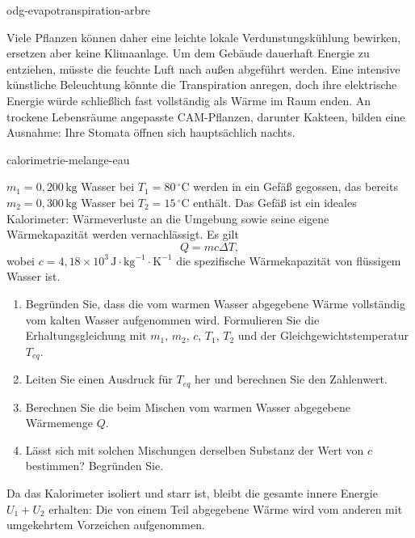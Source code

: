 \begin{exo}{odg-evapotranspiration-arbre}
\begin{solution}
Viele Pflanzen können daher eine leichte lokale Verdunstungskühlung bewirken, ersetzen aber keine Klimaanlage. Um dem Gebäude dauerhaft Energie zu entziehen, müsste die feuchte Luft nach außen abgeführt werden. Eine intensive künstliche Beleuchtung könnte die Transpiration anregen, doch ihre elektrische Energie würde schließlich fast vollständig als Wärme im Raum enden. An trockene Lebensräume angepasste CAM-Pflanzen, darunter Kakteen, bilden eine Ausnahme: Ihre Stomata öffnen sich hauptsächlich nachts.
\end{solution}
\end{exo}

\begin{exo}{calorimetrie-melange-eau}

$m_1=0{,}200\,\text{kg}$ Wasser bei $T_1=80\,^\circ\text{C}$ werden in ein Gefäß gegossen, das bereits $m_2=0{,}300\,\text{kg}$ Wasser bei $T_2=15\,^\circ\text{C}$ enthält. Das Gefäß ist ein ideales Kalorimeter: Wärmeverluste an die Umgebung sowie seine eigene Wärmekapazität werden vernachlässigt. Es gilt
\[
Q=mc\Delta T,
\]
wobei $c=4{,}18\times10^3\,\text{J}\!\cdot\!\text{kg}^{-1}\!\cdot\!\text{K}^{-1}$ die spezifische Wärmekapazität von flüssigem Wasser ist.

\begin{enumerate}
  \item Begründen Sie, dass die vom warmen Wasser abgegebene Wärme vollständig vom kalten Wasser aufgenommen wird. Formulieren Sie die Erhaltungsgleichung mit $m_1$, $m_2$, $c$, $T_1$, $T_2$ und der Gleichgewichtstemperatur $T_{eq}$.
  \item Leiten Sie einen Ausdruck für $T_{eq}$ her und berechnen Sie den Zahlenwert.
  \item Berechnen Sie die beim Mischen vom warmen Wasser abgegebene Wärmemenge $Q$.
  \item Lässt sich mit solchen Mischungen derselben Substanz der Wert von $c$ bestimmen? Begründen Sie.
\end{enumerate}

\begin{indication}
Da das Kalorimeter isoliert und starr ist, bleibt die gesamte innere Energie $U_1+U_2$ erhalten: Die von einem Teil abgegebene Wärme wird vom anderen mit umgekehrtem Vorzeichen aufgenommen.
\end{indication}


\end{exo}
